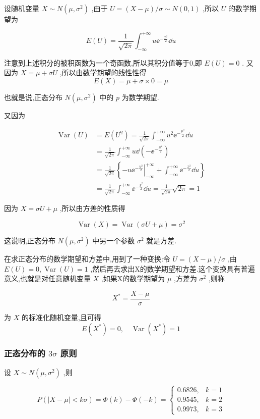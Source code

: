 设随机变量 $ X \sim N\left(\mu, \sigma^{2}\right) $ ,由于 $ U=(X-\mu) / \sigma \sim N(0,1) $ ,所以 $ U $ 的数学期望为

\[
E(U)=\frac{1}{\sqrt{2 \pi}} \int_{-\infty}^{+\infty} u \ee ^{-\frac{x^{2}}{2}} \dd u
\]

注意到上述积分的被积函数为一个奇函数,所以其积分值等于0,即 $ E(U)=0 $ .
又因为 $ X=\mu+\sigma U $ ,所以由数学期望的线性性得
\[
E(X)=\mu+\sigma \times 0=\mu
\]

也就是说,正态分布 $ N\left(\mu, \sigma^{2}\right) $ 中的 $ p $ 为数学期望.

又因为

\[
\begin{array}{ll}
{\operatorname{Var}(U)} & {=E\left(U^{2}\right)=\frac{1}{\sqrt{2 \pi}} \int_{-\infty}^{+\infty} u^{2} \ee ^{-\frac{\mu^{2}}{2}} \dd u} \\ 
{} & {=\frac{1}{\sqrt{2 \pi}} \int_{-\infty}^{+\infty} u \dd\left(-\ee ^{-\frac{\mu^{2}}{2}}\right)} \\ 
{} & {=\frac{1}{\sqrt{2 \pi}}\left\{-u\left.\ee ^{-\frac{u^{2}}{2}}\right|_{-\infty} ^{+\infty}+\int_{-\infty}^{+\infty} \ee ^{-\frac{x^{2}}{2}} \dd u\right\}} \\ 
{} & {=\frac{1}{\sqrt{2 \pi}} \int_{-\infty}^{+\infty} \ee ^{-\frac{y^{2}}{2}} \dd u=\frac{1}{\sqrt{2 \pi}} \sqrt{2 \pi}=1}
\end{array}
\]

因为 $ X=\sigma U+\mu $ ,所以由方差的性质得

\[
\operatorname{Var}(X)=\operatorname{Var}(\sigma U+\mu)=\sigma^{2}
\]

这说明,正态分布 $ N\left(\mu, \sigma^{2}\right) $ 中另一个参数 $ \sigma^{2} $ 就是方差.

在求正态分布的数学期望和方差中,用到了一种变换:令 $ U=(X-\mu) / \sigma $ ,由 $ E(U)=0, \operatorname{Var}(U)=1 $ ,然后再去求出X的数学期望和方差.这个变换具有普遍意义,也就是对任意随机变量 $ X $ ,如果X的数学期望为 $ \mu $ ,方差为 $ \sigma^{2} $ ,则称

\[
X^{*}=\frac{X-\mu}{\sigma}
\]

为 $ X $ 的标准化随机变量,且可得
\[
E\left(X^{*}\right)=0, \quad \operatorname{Var}\left(X^{*}\right)=1
\]

\subsubsection{正态分布的 $ 3\sigma $ 原则}
设 $ X \sim N\left(\mu, \sigma^{2}\right) $ ,则

\begin{equation}
P(|X-\mu|<k \sigma)=\Phi(k)-\Phi(-k)=\left\{\begin{array}{ll}{0.6826,} & {k=1} \\ {0.9545,} & {k=2} \\ {0.9973,} & {k=3}\end{array}\right. \label{eq:2.5.5}
\end{equation}


